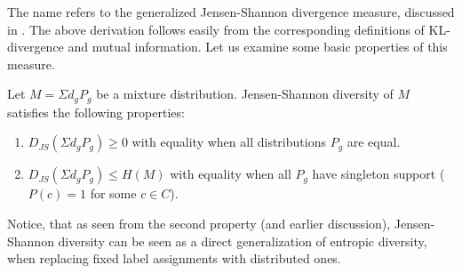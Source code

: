 The name refers to the generalized Jensen-Shannon divergence measure, 
discussed in \cite{FugledeTopsoe}. The above derivation follows easily
from the corresponding definitions of KL-divergence and mutual
information. Let us examine some basic properties of this measure.

\bep\label{jsd-properties}
Let $M=\Sigma d_g P_g$ be a mixture distribution. Jensen-Shannon
diversity of $M$ satisfies the following properties:
 \begin{enumerate}
   \item $D_{JS}(\Sigma d_gP_g)\geq 0$ with equality when all
     distributions $P_g$ are equal.
   \item $D_{JS}(\Sigma d_gP_g)\leq H(M)$ with equality when all
     $P_g$ have singleton support ($P(c)=1$ for some $c\in C$).
 \end{enumerate}
\eep
Notice, that as seen from the second property (and earlier
discussion), Jensen-Shannon diversity can be seen as a direct
generalization of entropic diversity, when replacing fixed label
assignments with distributed ones.
